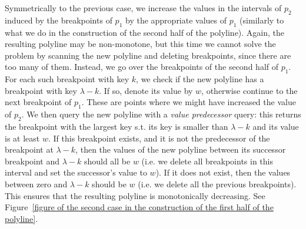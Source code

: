 \documentclass[11pt,a4paper]{article}
\theoremstyle{definition}
\theoremstyle{remark}
\begin{document}
\vspace{0.04in} 
Symmetrically to the previous case, we increase the values in the intervals of $p_2$ induced by the breakpoints of $p_1$ by the appropriate values of $p_{1}$ (similarly to what we do in the construction of the second half of the polyline). Again, the resulting polyline may be non-monotone, but this time we cannot solve the problem by scanning the new polyline and deleting breakpoints, since there are too many of them. Instead, we go over the breakpoints of the second half of $p_1$. For each such breakpoint  with key $k$, we check if the new polyline has a breakpoint with key $\lambda - k$. If so, denote its value by $w$, otherwise continue to the next breakpoint of $p_1$. These are points where we might have increased the value of $p_2$. We then query the new polyline with a \emph{value predecessor} query: this returns the breakpoint with the largest key s.t. its key is smaller than $\lambda - k$ and its value is at least $w$. 
%
If this breakpoint exists, and it is not the predecessor of the breakpoint at $\lambda - k$, then the values of the new polyline between its successor breakpoint and $\lambda - k$ should all be $w$ (i.e. we delete all breakpoints in this interval and set the successor's value to $w$). %
If it does not exist, then the values between zero and $\lambda - k$ should be $w$ (i.e. we delete all the previous breakpoints). 
This ensures that the resulting polyline is monotonically decreasing. 
See  Figure~\ref{figure of the second case in the construction of the first half of the polyline}.
\end{document}
